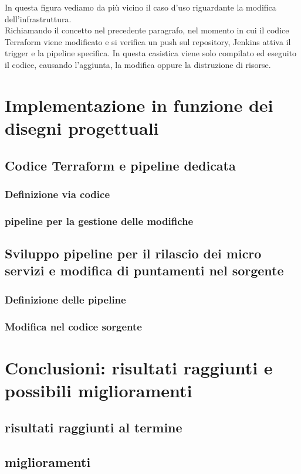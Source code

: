 \documentclass[a4paper,12pt]{report}
\begin{document}
In questa figura vediamo da più vicino il caso d'uso riguardante la modifica dell'infrastruttura. \\
Richiamando il concetto nel precedente paragrafo, nel momento in cui il codice Terraform viene modificato e si verifica un push sul repository, Jenkins attiva il trigger e la pipeline specifica. In questa casistica viene solo compilato ed eseguito il codice, causando l'aggiunta, la modifica oppure la distruzione di risorse.

\chapter{Implementazione in funzione dei disegni progettuali}
\section{Codice Terraform e pipeline dedicata}
\subsection{Definizione via codice}
\subsection{pipeline per la gestione delle modifiche}
\section{Sviluppo pipeline per il rilascio dei micro servizi e modifica di puntamenti nel sorgente}
\subsection{Definizione delle pipeline}
\subsection{Modifica nel codice sorgente}

\chapter{Conclusioni: risultati raggiunti e possibili miglioramenti}
\section{risultati raggiunti al termine}
\section{miglioramenti}
\end{document}

